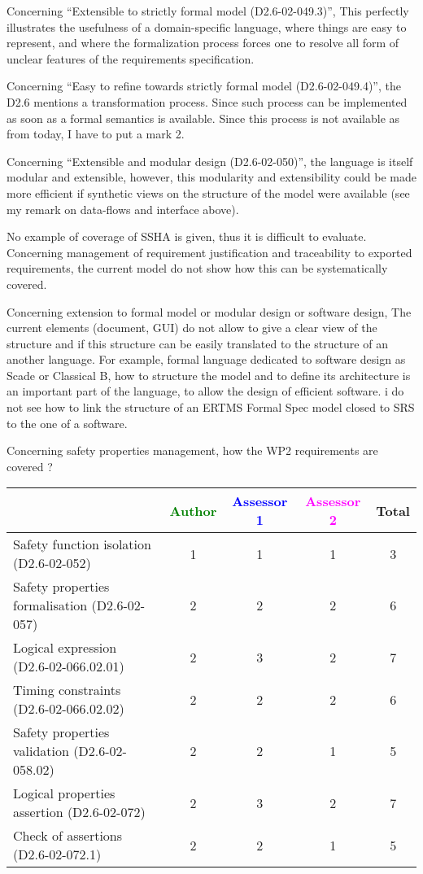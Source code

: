 \begin{assessor1}
Concerning "`Extensible to strictly formal model (D2.6-02-049.3)"', This perfectly illustrates the usefulness of a domain-specific language, where things are easy to represent, and where the formalization process forces one to resolve all form of unclear features of the requirements specification. 

Concerning "`Easy to refine towards strictly formal model (D2.6-02-049.4)"', the D2.6 mentions a transformation process. Since such process can be implemented as soon as a formal semantics is available. Since this process is not available as from today, I have to put a mark 2. 

Concerning "`Extensible and modular design (D2.6-02-050)"', the language is itself modular and extensible, however, this modularity and extensibility could be made more efficient if synthetic views on the structure of the model were available (see my remark on data-flows and interface above). 
\end{assessor1}

\begin{assessor2}
No example of coverage of SSHA is given, thus it is difficult to evaluate. Concerning management of requirement justification and traceability to exported requirements, the current model do not show how this can be systematically covered.

Concerning extension to formal model or modular design or software design, The current elements (document, GUI)  do not allow to give a clear view of the structure and if this structure can be easily translated to  the structure of an another language. For example, formal language dedicated to software design as Scade or Classical B, how to structure the model and to define its architecture is an important part of the language, to allow the design of efficient software. i do not see how to link the structure of an ERTMS Formal Spec model closed to SRS to  the one of a software.

\end{assessor2}


Concerning safety properties management, how the WP2 requirements are covered ?

\begin{tabular}{|l | c | c | c | c|}
\hline
& \textcolor{green}{Author} & \textcolor{blue}{Assessor 1} & \textcolor{magenta}{Assessor 2} & Total \\
\hline 
Safety function isolation (D2.6-02-052)  & 1 & 1 & 1 & 3 \\
\hline 
Safety properties formalisation (D2.6-02-057)  & 2 & 2 & 2 & 6 \\
\hline
Logical expression (D2.6-02-066.02.01)  & 2 & 3 & 2 & 7 \\
\hline
Timing constraints (D2.6-02-066.02.02)  & 2 & 2 & 2 & 6 \\
\hline
Safety properties validation (D2.6-02-058.02)  & 2 & 2 & 1 & 5 \\
\hline
Logical properties assertion (D2.6-02-072)  & 2 & 3 & 2 & 7 \\
\hline
Check  of assertions (D2.6-02-072.1)  & 2 & 2 & 1 & 5 \\
\hline
\end{tabular}

